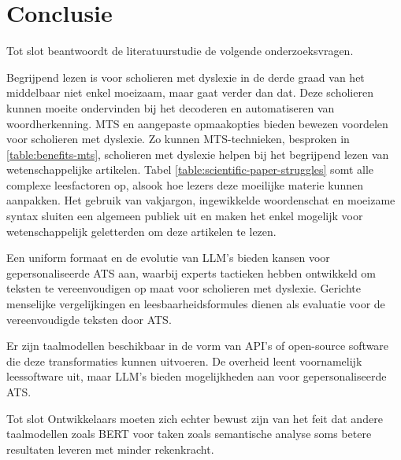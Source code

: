 \section{Conclusie}

Tot slot beantwoordt de literatuurstudie de volgende onderzoeksvragen.


Begrijpend lezen is voor scholieren met dyslexie in de derde graad van het middelbaar niet enkel moeizaam, maar gaat verder dan dat. Deze scholieren kunnen moeite ondervinden bij het decoderen en automatiseren van woordherkenning. MTS en aangepaste opmaakopties bieden bewezen voordelen voor scholieren met dyslexie. Zo kunnen MTS-technieken, besproken in \ref{table:benefits-mts}, scholieren met dyslexie helpen bij het begrijpend lezen van wetenschappelijke artikelen. Tabel \ref{table:scientific-paper-struggles} somt alle complexe leesfactoren op, alsook hoe lezers deze moeilijke materie kunnen aanpakken. Het gebruik van vakjargon, ingewikkelde woordenschat en moeizame syntax sluiten een algemeen publiek uit en maken het enkel mogelijk voor wetenschappelijk geletterden om deze artikelen te lezen.

\medspace

Een uniform formaat en de evolutie van LLM's bieden kansen voor gepersonaliseerde ATS aan, waarbij experts tactieken hebben ontwikkeld om teksten te vereenvoudigen op maat voor scholieren met dyslexie. Gerichte menselijke vergelijkingen en leesbaarheidsformules dienen als evaluatie voor de vereenvoudigde teksten door ATS.

\medspace

Er zijn taalmodellen beschikbaar in de vorm van API's of open-source software die deze transformaties kunnen uitvoeren. De overheid leent voornamelijk leessoftware uit, maar LLM's bieden mogelijkheden aan voor gepersonaliseerde ATS. 

\medspace

Tot slot Ontwikkelaars moeten zich echter bewust zijn van het feit dat andere taalmodellen zoals BERT voor taken zoals semantische analyse soms betere resultaten leveren met minder rekenkracht.